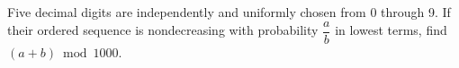 Five decimal digits are independently and uniformly chosen from 0 through 9. If their ordered sequence is nondecreasing with probability $\dfrac{a}{b}$ in lowest terms, find $(a+b)\bmod1000$.
